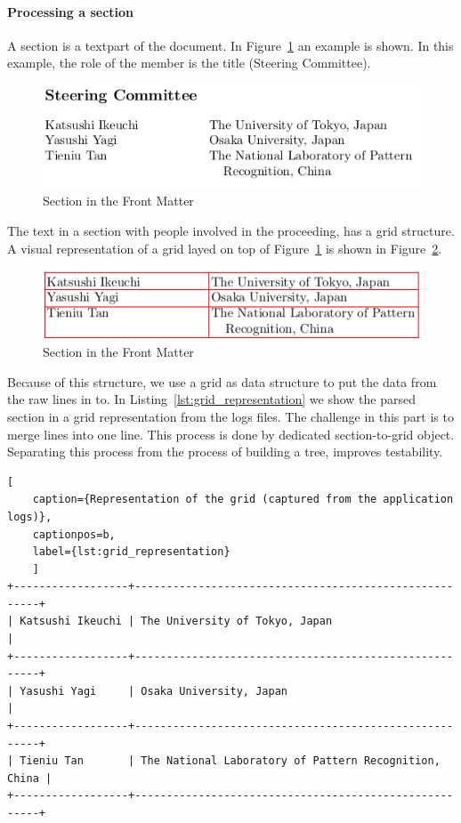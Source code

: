 \documentclass{ou-report}
\begin{document}
\paragraph{Processing a section}
A section is a textpart of the document. In 
Figure~\ref{fig:front_matter_section} an example is shown. In this example, the
role of the member is the title (Steering Committee).
\begin{figure}[H]
    \centering
    \includegraphics[width=12cm]{images/front_matter/section.png}
    \caption{Section in the Front Matter}
    \label{fig:front_matter_section}
\end{figure}
The text in a section with people involved in the proceeding, has a grid
structure. A visual representation of a grid layed on top of 
Figure~\ref{fig:front_matter_section} is shown in 
Figure~\ref{fig:front_matter_section_grid}. 
\begin{figure}[H]
    \centering
    \includegraphics[width=12cm]{images/front_matter/section_table.png}
    \caption{Section in the Front Matter}
    \label{fig:front_matter_section_grid}
\end{figure}
Because of this structure, we use a grid as data structure to put the data from 
the raw lines in to. In Listing~\ref{lst:grid_representation} we show the 
parsed section in a grid representation from the logs files. 
The challenge in this part is to merge lines into one line.
This process is done by dedicated section-to-grid object. Separating this
process from the process of building a tree, improves testability.

\begin{lstlisting}[
    caption={Representation of the grid (captured from the application logs)},
    captionpos=b,
    label={lst:grid_representation}
    ]
+------------------+-------------------------------------------------------+
| Katsushi Ikeuchi | The University of Tokyo, Japan                        |
+------------------+-------------------------------------------------------+
| Yasushi Yagi     | Osaka University, Japan                               |
+------------------+-------------------------------------------------------+
| Tieniu Tan       | The National Laboratory of Pattern Recognition, China |
+------------------+-------------------------------------------------------+
\end{lstlisting}
\end{document}
